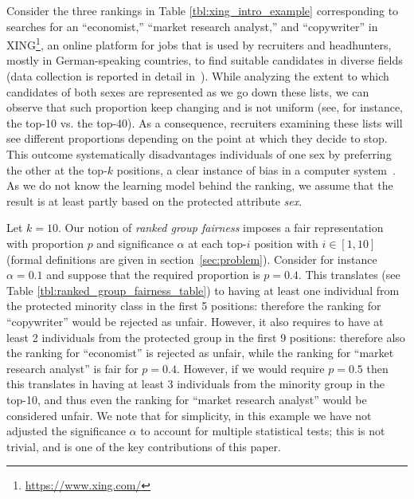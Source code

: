\medskip
\begin{example} Consider the three rankings in Table \ref{tbl:xing_intro_example} corresponding to searches for an ``economist,'' ``market research analyst,'' and ``copywriter'' in XING\footnote{\url{https://www.xing.com/}}, an online platform for jobs that is used by recruiters and headhunters, mostly in German-speaking countries, to find suitable candidates in diverse fields (data collection is reported in detail in~\cite{zehlike2017fair}). While analyzing  the extent to which candidates of both sexes are represented as we go down these lists,  we can observe that such proportion keep changing and is not uniform (see, for instance, the top-10 vs. the top-40). As a consequence, recruiters examining these lists will see different proportions depending on the point at which they decide to stop.
%
This outcome systematically disadvantages individuals of one sex by preferring the other at the top-$k$ positions, a clear instance of bias in a computer system~\cite{friedman1996bias}. As we do not know the learning model behind the ranking, we assume that the result is at least partly based on the protected attribute \emph{sex}.


Let $k = 10$. Our notion of \textit{ranked group fairness} imposes a fair representation with proportion $p$ and significance $\alpha$ at each top-$i$ position with $i \in [1,10]$ (formal definitions are given in section~\ref{sec:problem}).
Consider for instance $\alpha = 0.1$ and suppose that the required proportion is $p = 0.4$.  This translates (see Table \ref{tbl:ranked_group_fairness_table}) to having at least one individual from the protected minority class in the first 5 positions: therefore the ranking for  ``copywriter'' would be rejected as unfair. However, it also requires to have at least 2 individuals from the protected group in the first 9 positions: therefore also the ranking for ``economist'' is rejected as unfair, while the ranking for ``market research analyst'' is fair for  $p = 0.4$. However, if we would require $p = 0.5$ then this translates in having at least 3 individuals from the minority group in the top-10, and thus even the ranking for ``market research analyst'' would be considered unfair.
%
We note that for simplicity, in this example we have not adjusted the significance $\alpha$ to account for multiple statistical tests; this is not trivial, and is one of the key contributions of this paper.
\end{example}
\medskip

